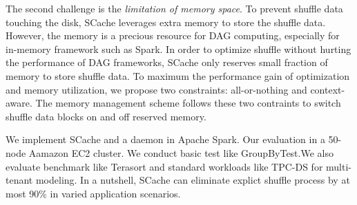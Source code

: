 The second challenge is the \textit{limitation of memory space}. To prevent shuffle data touching the disk, SCache leverages extra memory to store the shuffle data. However, the memory is a precious resource for DAG computing, especially for in-memory framework such as Spark\cite{spark}. In order to optimize shuffle without hurting the performance of DAG frameworks, SCache only reserves small fraction of memory to store shuffle data. To maximum the performance gain of optimization and memory utilization, we propose two constraints: all-or-nothing and context-aware. The memory management scheme follows these two contraints to switch shuffle data blocks on and off reserved memory.

We implement SCache and a daemon in Apache Spark\cite{apachespark}. Our evaluation in a 50-node Aamazon EC2 cluster. We conduct basic test like GroupByTest.We also evaluate benchmark like Terasort\cite{spark-tera} and standard workloads like TPC-DS\cite{tpcds} for multi-tenant modeling. In a nutshell, SCache can eliminate explict shuffle process by at most 90\% in varied application scenarios.





